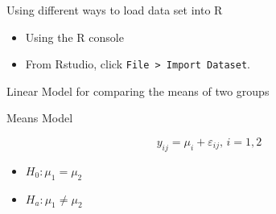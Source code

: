 \begin{frame}[fragile]{Using different ways to load data set into R}

\begin{itemize}
\tightlist
\item
  Using the R console
\end{itemize}

\begin{Shaded}
\begin{Highlighting}[]
\StringTok{ }\NormalTok{(}\NormalTok{, } \NormalTok{, }\NormalTok{)}
\StringTok{ }\NormalTok{(}\NormalTok{)}
\StringTok{ }\NormalTok{(}\NormalTok{)}
\StringTok{ }\OperatorTok{::}\NormalTok{(}\NormalTok{)}
\end{Highlighting}
\end{Shaded}

\begin{itemize}
\tightlist
\item
  From Rstudio, click \texttt{File\ \textgreater{}\ Import\ Dataset}.
\end{itemize}

\end{frame}

\begin{frame}{Linear Model for comparing the means of two groups}

\begin{block}{Means Model}

\[y_{ij} = \mu_i + \varepsilon_{ij},\, i = 1,2\]

\begin{itemize}
\tightlist
\item
  \(H_0: \mu_1 = \mu_2\)
\item
  \(H_a: \mu_1\neq\mu_2\)
\end{itemize}

\end{block}

\end{frame}

